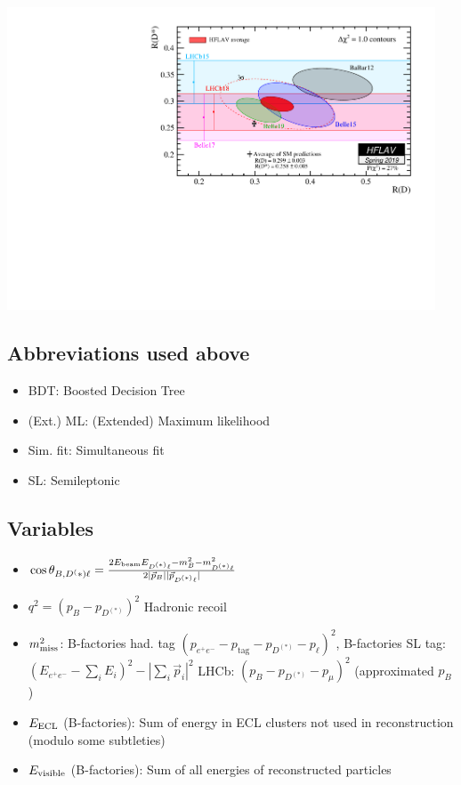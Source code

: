     \vspace{0.4cm}
    \begin{minipage}{14cm}
       \includegraphics[height=9cm]{fig/hflav.pdf}
    \end{minipage}
    \begin{minipage}{10cm}
       \subsection*{Abbreviations used above}
       \begin{itemize}
          \item BDT: Boosted Decision Tree
          \item (Ext.) ML: (Extended) Maximum likelihood
          \item Sim. fit: Simultaneous fit
          \item SL: Semileptonic
         \end{itemize}
         \subsection*{Variables}
         \begin{itemize}
            \item $\cos\theta_{B, D^(*)\ell} = \frac{2 E_\text{beam} E_{D^{(*)}\ell} - m_B^2 - m_{D^{(*)}\ell}^2}{2|\vec p_B||\vec p_{D^{(*)}\ell}|}$
            \item $q^2=(p_B-p_{D^{(*)}})^2$ Hadronic recoil
            \item $m_\text{miss}^2$: 
               B-factories had. tag $(p_{e^+e^-}-p_\text{tag}-p_{D^{(*)}}-p_\ell)^2$, 
               B-factories SL tag: $(E_{e^+e^-}-\sum_i E_i)^2 - |\sum_i \vec p_i|^2$
               LHCb: $(p_B-p_{D^{(*)}}-p_\mu)^2$ (approximated $p_B$)
            \item $E_\text{ECL}$ (B-factories): Sum of energy in ECL clusters not used in reconstruction (modulo some subtleties)
            \item $E_\text{visible}$ (B-factories): Sum of all energies of reconstructed particles
         \end{itemize}
    \end{minipage}

